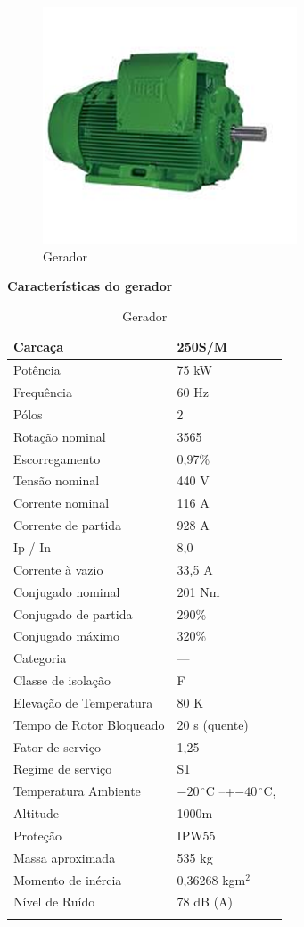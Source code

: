 \FloatBarrier
\begin{figure}[!ht]
\centering
\includegraphics[scale=0.6]{editaveis/figuras/gerador}
\caption[Gerador]{Gerador\footnotemark}

\label{gerador}
\end{figure}
\FloatBarrier

\textbf{Características do gerador}
\begin{longtable}{|p{4cm}|p{9cm}|}\hline
Carcaça	& 250S/M \\ \hline
Potência& 	75 kW\\ \hline
Frequência& 	60 Hz\\ \hline
Pólos	& 2\\ \hline
Rotação nominal	& 3565\\ \hline
Escorregamento	& 0,97\%\\ \hline
Tensão nominal	& 440 V\\ \hline
Corrente nominal& 	116 A\\ \hline
Corrente de partida& 	928 A\\ \hline
Ip / In	& 8,0\\ \hline
Corrente à vazio	& 33,5 A\\ \hline
Conjugado nominal& 	201 Nm\\ \hline
Conjugado de partida& 	290\%\\ \hline
Conjugado máximo	& 320\%\\ \hline
Categoria	& ---\\ \hline
Classe de isolação	& F\\ \hline
Elevação de Temperatura& 	80 K\\ \hline
Tempo de Rotor Bloqueado& 	20 s (quente)\\ \hline
Fator de serviço& 	1,25\\ \hline
Regime de serviço& 	S1\\ \hline
Temperatura Ambiente& 	$-20\,^{\circ}\mathrm{C}$ –+$-40\,^{\circ}\mathrm{C}$,
\\ \hline
Altitude	& 1000m\\ \hline
Proteção	& IPW55\\ \hline
Massa aproximada	& 535 kg\\ \hline
Momento de inércia	& 0,36268 kgm$^{2}$\\ \hline
Nível de Ruído	& 78 dB (A)\\ \hline
\caption[Gerador]{Gerador\footnotemark}
\end{longtable}

\FloatBarrier